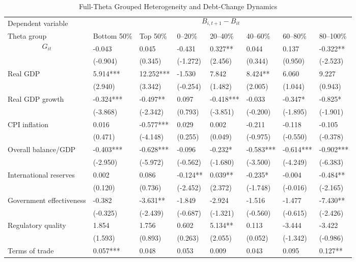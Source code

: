 \begin{table}[H]\centering
\begin{threeparttable}
\caption{Full-Theta Grouped Heterogeneity and Debt-Change Dynamics}
\label{tab:theta_group_heterogeneity_debt}
\scriptsize
\begin{tabularx}{\textwidth}{lYYYYYYY}
\toprule
Dependent variable &  \\
\cmidrule(lr){2-8}
Theta group & Bottom 50\% & Top 50\% & 0--20\% & 20--40\% & 40--60\% & 60--80\% & 80--100\% \\
\midrule
$$G_{it}$$ & -0.043 & 0.045 & -0.431 & 0.327** & 0.044 & 0.137 & -0.322** \\
  & (-0.904) & (0.345) & (-1.272) & (2.456) & (0.344) & (0.950) & (-2.523) \\
Real GDP & 5.914*** & 12.252*** & -1.530 & 7.842 & 8.424** & 6.060 & 9.227 \\
  & (2.940) & (3.342) & (-0.254) & (1.482) & (2.005) & (1.044) & (0.943) \\
Real GDP growth & -0.324*** & -0.497** & 0.097 & -0.418*** & -0.033 & -0.347* & -0.825* \\
  & (-3.868) & (-2.342) & (0.793) & (-3.851) & (-0.200) & (-1.895) & (-1.901) \\
CPI inflation & 0.016 & -0.577*** & 0.029 & 0.002 & -0.211 & -0.118 & -0.105 \\
  & (0.471) & (-4.148) & (0.255) & (0.049) & (-0.975) & (-0.550) & (-0.378) \\
Overall balance/GDP & -0.403*** & -0.628*** & -0.096 & -0.232* & -0.583*** & -0.614*** & -0.902*** \\
  & (-2.950) & (-5.972) & (-0.562) & (-1.680) & (-3.500) & (-4.249) & (-6.383) \\
International reserves & 0.002 & 0.086 & -0.124** & 0.039** & -0.235* & -0.004 & -0.484** \\
  & (0.120) & (0.736) & (-2.452) & (2.372) & (-1.748) & (-0.016) & (-2.165) \\
Government effectiveness & -0.382 & -3.631** & -1.849 & -2.924 & -1.516 & -1.477 & -7.430** \\
  & (-0.325) & (-2.439) & (-0.687) & (-1.321) & (-0.560) & (-0.615) & (-2.426) \\
Regulatory quality & 1.854 & 1.756 & 0.602 & 5.134** & 0.113 & -3.444 & -3.422 \\
  & (1.593) & (0.893) & (0.263) & (2.055) & (0.052) & (-1.342) & (-0.986) \\
Terms of trade & 0.057*** & 0.048 & 0.053 & 0.009 & 0.043 & 0.095 & 0.127** \\

\end{tabularx}
\end{threeparttable}
\end{table}
